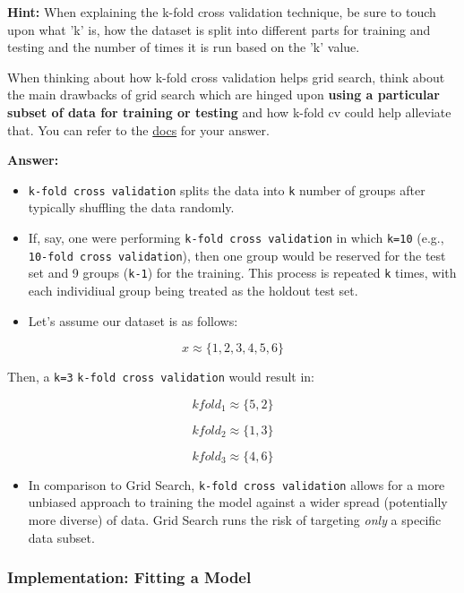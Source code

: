 \documentclass[11pt]{article}
\providecommand{\tightlist}{%
      \setlength{\itemsep}{0pt}\setlength{\parskip}{0pt}}
\begin{document}
\textbf{Hint:} When explaining the k-fold cross validation technique, be
sure to touch upon what 'k' is, how the dataset is split into different
parts for training and testing and the number of times it is run based
on the 'k' value.

When thinking about how k-fold cross validation helps grid search, think
about the main drawbacks of grid search which are hinged upon
\textbf{using a particular subset of data for training or testing} and
how k-fold cv could help alleviate that. You can refer to the
\href{http://scikit-learn.org/stable/modules/cross_validation.html\#cross-validation}{docs}
for your answer.

    \textbf{Answer: }

\begin{itemize}
\tightlist
\item
  \texttt{k-fold\ cross\ validation} splits the data into \texttt{k}
  number of groups after typically shuffling the data randomly.
\item
  If, say, one were performing \texttt{k-fold\ cross\ validation} in
  which \texttt{k=10} (e.g., \texttt{10-fold\ cross\ validation}), then
  one group would be reserved for the test set and 9 groups
  (\texttt{k-1}) for the training. This process is repeated \texttt{k}
  times, with each individiual group being treated as the holdout test
  set.
\item
  Let's assume our dataset is as follows:
\end{itemize}

\[x \approx \{1,2,3,4,5,6\}\]

Then, a \texttt{k=3} \texttt{k-fold\ cross\ validation} would result in:

\[kfold_1 \approx \{5,2\}\]

\[kfold_2 \approx \{1,3\}\]

\[kfold_3 \approx \{4,6\}\]

\begin{itemize}
\tightlist
\item
  In comparison to Grid Search, \texttt{k-fold\ cross\ validation}
  allows for a more unbiased approach to training the model against a
  wider spread (potentially more diverse) of data. Grid Search runs the
  risk of targeting \emph{only} a specific data subset.
\end{itemize}

    \subsubsection{Implementation: Fitting a
Model}\label{implementation-fitting-a-model}
\end{document}
